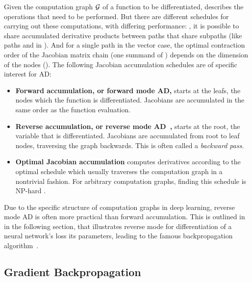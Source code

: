 Given the computation graph ${\mathcal{G}}$ of a function to be differentiated,
 describes the operations that need to
be performed. But there are different schedules for carrying out these
computations, with differing performance: \eg, it is possible to share
accumulated derivative products between paths that share subpaths (like paths
 and
 in
). And for a single path in the vector
case, the optimal contraction order of the Jacobian matrix chain (one summand of
) depends on the dimension of the nodes
(). The following Jacobian accumulation
schedules are of specific interest for AD:
\begin{itemize}
\item \textbf{Forward accumulation, or forward mode AD,} starts at the leafs,
  \ie the nodes \wrt which the function is differentiated. Jacobians are
  accumulated in the same order as the function evaluation.
\item \textbf{Reverse accumulation, or reverse mode
    AD~\cite{griewank2012invented,linnainmaa1976taylor},} starts at the root,
  \ie the variable that is differentiated. Jacobians are accumulated from root
  to leaf nodes, traversing the graph backwards. This is often called a
  \emph{backward pass}.
\item \textbf{Optimal Jacobian accumulation} computes derivatives according to
  the optimal schedule which usually traverses the computation graph in a
  nontrivial fashion. For arbitrary computation graphs, finding this schedule is
  NP-hard \cite{naumann2008optimal}.
\end{itemize}
Due to the specific structure of computation graphs in deep learning, reverse
mode AD is often more practical than forward accumulation. This is outlined in
in the following section, that illustrates reverse mode for differentiation of a
neural network's loss \wrt its parameters, leading to the famous backpropagation
algorithm~\cite{rumelhart1986learning}.

\subsection{Gradient Backpropagation}\label{sec:background:GradientBackpropagationInMLLibraries}

